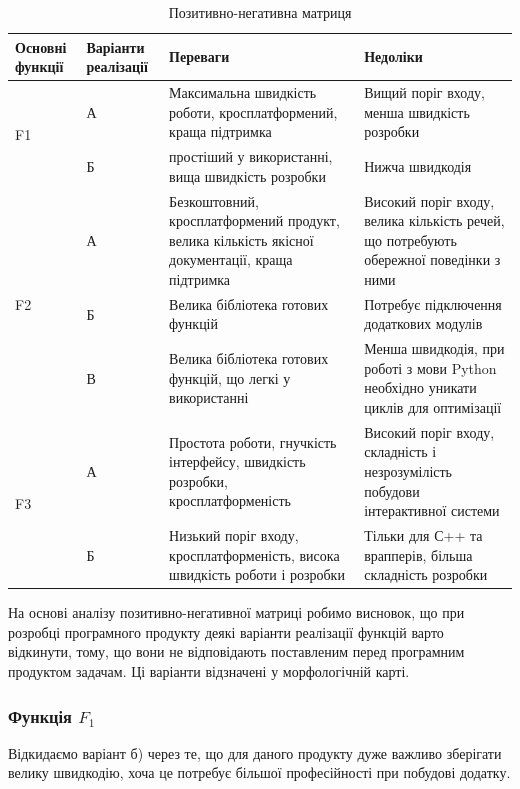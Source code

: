 \begin{table}[tbp]
	\caption{Позитивно-негативна матриця}
	\centering
\begin{tabular}{|p{}|p{}|p{}|p{}|}\hline
	Основні функції & Варіанти реалізації & Переваги &  Недоліки \\ 
\hline
\multirow{2}{*}{F1}	& А &  Максимальна швидкість роботи, кросплатформений, краща підтримка
					& Вищий поріг входу, менша швидкість розробки\\ 
	 \cline{2-4} 
					& Б & простіший у використанні, вища швидкість розробки
				    & Нижча швидкодія\\
\hline
\multirow{3}{*}{F2} & А &  Безкоштовний, кросплатформений продукт, велика кількість якісної документації, краща підтримка
					& Високий поріг входу, велика кількість речей, що потребують обережної поведінки з ними\\ 
	\cline{2-4}         
					& Б & Велика бібліотека готових функцій
					& Потребує підключення додаткових модулів\\
	\cline{2-4}         
					& В & Велика бібліотека готових функцій, що легкі у використанні 
					& Менша швидкодія, при роботі з мови Python необхідно уникати циклів для оптимізації\\
\hline
\multirow{2}{*}{F3} & А & Простота роботи, гнучкість інтерфейсу, швидкість розробки, кросплатформеність
					& Високий поріг входу, складність і незрозумілість побудови інтерактивної системи \\
	\cline{2-4}
					& Б & Низький поріг входу, кросплатформеність, висока швидкість роботи і розробки
					& Тільки для С++ та врапперів, більша складність розробки\\
\hline
	\end{tabular}
	\label{tab:economics_positive_negative_matrix}
\end{table}

На основі аналізу позитивно-негативної матриці робимо висновок, що при розробці програмного продукту деякі варіанти реалізації функцій варто відкинути, тому, що вони не відповідають поставленим перед програмним продуктом задачам. Ці варіанти відзначені у морфологічній карті.
\subsubsection{Функція $F_1$}
Відкидаємо варіант б) через те, що для даного продукту дуже важливо зберігати велику швидкодію, хоча це потребує більшої професійності при побудові додатку.
